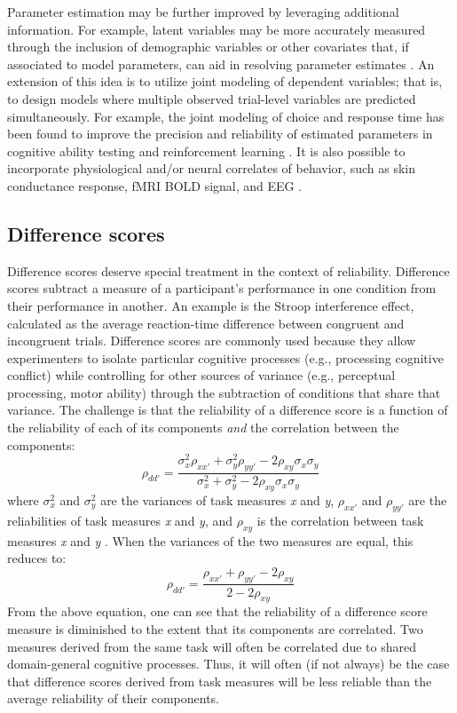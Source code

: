 \documentclass[a4paper,12pt]{article}
\begin{document}
Parameter estimation may be further improved by leveraging additional information. For example, latent variables may be more accurately measured through the inclusion of demographic variables or other covariates that, if associated to model parameters, can aid in resolving parameter estimates \cite{Curran2016-bt}. An extension of this idea is to utilize joint modeling of dependent variables; that is, to design models where multiple observed trial-level variables are predicted simultaneously. For example, the joint modeling of choice and response time has been found to improve the precision and reliability of estimated parameters in cognitive ability testing \cite{bertling2018using} and reinforcement learning \cite{ballard2019joint, shahar2019improving}. It is also possible to incorporate physiological and/or neural correlates of behavior, such as skin conductance response, fMRI BOLD signal, and EEG \cite{palestro2018tutorial}. 

\subsection{Difference scores}

Difference scores deserve special treatment in the context of reliability. Difference scores subtract a measure of a participant's performance in one condition from their performance in another. An example is the Stroop interference effect, calculated as the average reaction-time difference between congruent and incongruent trials. Difference scores are commonly used because they allow experimenters to isolate particular cognitive processes (e.g., processing cognitive conflict) while controlling for other sources of variance (e.g., perceptual processing, motor ability) through the subtraction of conditions that share that variance. The challenge is that the reliability of a difference score is a function of the reliability of each of its components \textit{and} the correlation between the components:
\begin{equation}
    \rho_{dd'} = \frac{\sigma^2_x \rho_{xx'} + \sigma^2_y \rho_{yy'} - 2 \rho_{xy} \sigma_x \sigma_y}{\sigma^2_x + \sigma^2_y - 2 \rho_{xy} \sigma_x \sigma_y}
\end{equation}
where $\sigma^2_x$ and $\sigma^2_y$ are the variances of task measures \textit{x} and \textit{y}, $\rho_{xx'}$ and $\rho_{yy'}$ are the reliabilities of task measures \textit{x} and \textit{y}, and $\rho_{xy}$ is the correlation between task measures \textit{x} and \textit{y} \cite{chiou1996reliability}. When the variances of the two measures are equal, this reduces to: 
\begin{equation}
    \rho_{dd'} = \frac{\rho_{xx'} + \rho_{yy'} - 2 \rho_{xy}}{2 - 2 \rho_{xy}}
\end{equation}
From the above equation, one can see that the reliability of a difference score measure is diminished to the extent that its components are correlated. Two measures derived from the same task will often be correlated due to shared domain-general cognitive processes. Thus, it will often (if not always) be the case that difference scores derived from task measures will be less reliable than the average reliability of their components. 
\end{document}
